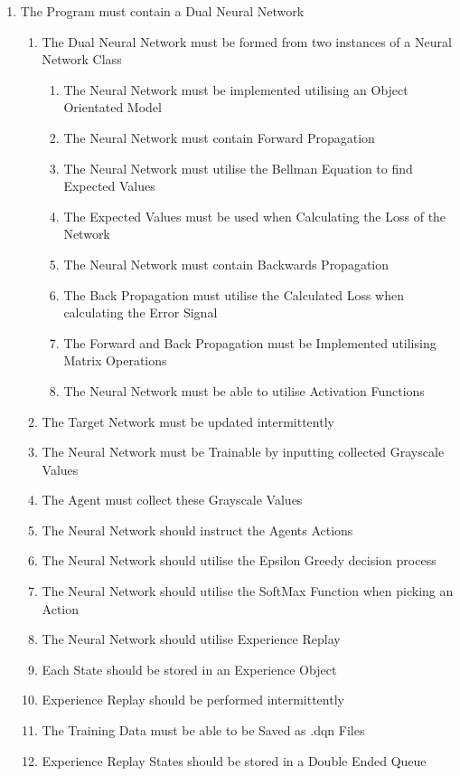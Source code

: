 \begin{flushleft}
\begin{enumerate}
                \item The Program must contain a Dual Neural Network
                \begin{enumerate}
                    \item The Dual Neural Network must be formed from two instances of a Neural Network Class
                    \begin{enumerate}
                        \item The Neural Network must be implemented utilising an Object Orientated Model
                        \item The Neural Network must contain Forward Propagation
                        \item The Neural Network must utilise the Bellman Equation to find Expected Values
                        \item The Expected Values must be used when Calculating the Loss of the Network
                        \item The Neural Network must contain Backwards Propagation
                        \item The Back Propagation must utilise the Calculated Loss when calculating the Error Signal
                        \item The Forward and Back Propagation must be Implemented utilising Matrix Operations
                        \item The Neural Network must be able to utilise Activation Functions
                    \end{enumerate}
                    \item The Target Network must be updated intermittently
                    \item The Neural Network must be Trainable by inputting collected Grayscale Values
                    \item The Agent must collect these Grayscale Values
                    \item The Neural Network should instruct the Agents Actions
                    \item The Neural Network should utilise the Epsilon Greedy decision process
                    \item The Neural Network should utilise the SoftMax Function when picking an Action
                    \item The Neural Network should utilise Experience Replay
                    \item Each State should be stored in an Experience Object
                    \item Experience Replay should be performed intermittently
                    \item The Training Data must be able to be Saved as .dqn Files
                    \item Experience Replay States should be stored in a Double Ended Queue
                \end{enumerate}


\end{enumerate}
\end{flushleft}
